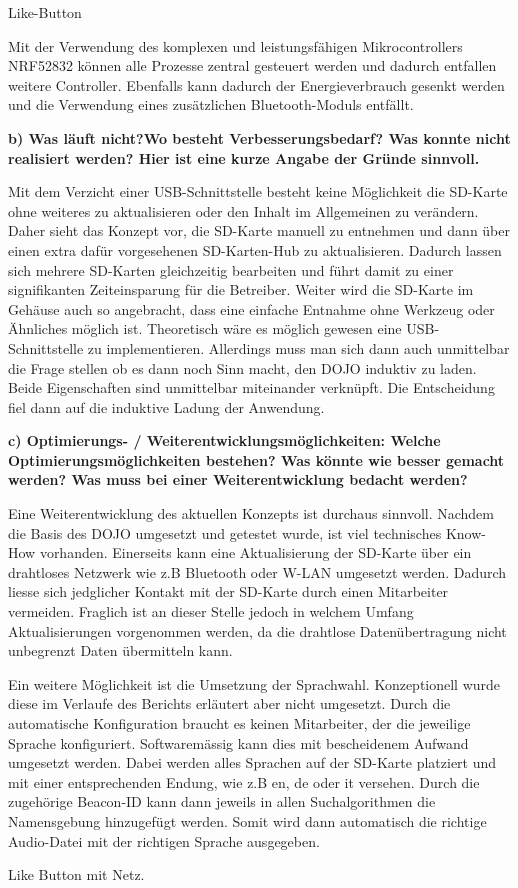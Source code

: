 Like-Button

Mit der Verwendung des komplexen und leistungsfähigen Mikrocontrollers NRF52832 können alle Prozesse zentral gesteuert werden und dadurch entfallen weitere Controller. Ebenfalls kann dadurch der Energieverbrauch gesenkt werden und die Verwendung eines zusätzlichen Bluetooth-Moduls entfällt.

\textbf{b) Was läuft nicht?Wo besteht Verbesserungsbedarf? Was konnte nicht realisiert werden? Hier ist eine kurze Angabe der Gründe sinnvoll.}

Mit dem Verzicht einer USB-Schnittstelle besteht keine Möglichkeit die SD-Karte ohne weiteres zu aktualisieren oder den Inhalt im Allgemeinen zu verändern. Daher sieht das Konzept vor, die SD-Karte manuell zu entnehmen und dann über einen extra dafür vorgesehenen SD-Karten-Hub zu aktualisieren. Dadurch lassen sich mehrere SD-Karten gleichzeitig bearbeiten und führt damit zu einer signifikanten Zeiteinsparung für die Betreiber. Weiter wird die SD-Karte im Gehäuse auch so angebracht, dass eine einfache Entnahme ohne Werkzeug oder Ähnliches möglich ist. Theoretisch wäre es möglich gewesen eine USB-Schnittstelle zu implementieren. Allerdings muss man sich dann auch unmittelbar die Frage stellen ob es dann noch Sinn macht, den DOJO induktiv zu laden. Beide Eigenschaften sind unmittelbar miteinander verknüpft. Die Entscheidung fiel dann auf die induktive Ladung der Anwendung.

\textbf{c) Optimierungs- / Weiterentwicklungsmöglichkeiten: Welche Optimierungsmöglichkeiten bestehen? Was könnte wie besser gemacht werden? Was muss bei einer Weiterentwicklung bedacht werden?
}

Eine Weiterentwicklung des aktuellen Konzepts ist durchaus sinnvoll. Nachdem die Basis des DOJO umgesetzt und getestet wurde, ist viel technisches \glqq Know-How \grqq vorhanden. Einerseits kann eine Aktualisierung der SD-Karte über ein drahtloses Netzwerk wie z.B Bluetooth oder W-LAN umgesetzt werden. Dadurch liesse sich jedglicher Kontakt mit der SD-Karte durch einen Mitarbeiter vermeiden. Fraglich ist an dieser Stelle jedoch in welchem Umfang Aktualisierungen vorgenommen werden, da die drahtlose Datenübertragung nicht unbegrenzt Daten übermitteln kann.

Ein weitere Möglichkeit ist die Umsetzung der Sprachwahl. Konzeptionell wurde diese im Verlaufe des Berichts erläutert aber nicht umgesetzt. Durch die automatische Konfiguration braucht es keinen Mitarbeiter, der die jeweilige Sprache konfiguriert. Softwaremässig kann dies mit bescheidenem Aufwand umgesetzt werden. Dabei werden alles Sprachen auf der SD-Karte platziert und mit einer entsprechenden Endung, wie z.B en, de oder it versehen. Durch die zugehörige Beacon-ID kann dann jeweils in allen Suchalgorithmen die Namensgebung hinzugefügt werden. Somit wird dann automatisch die richtige Audio-Datei mit der richtigen Sprache ausgegeben.

Like Button mit Netz.
